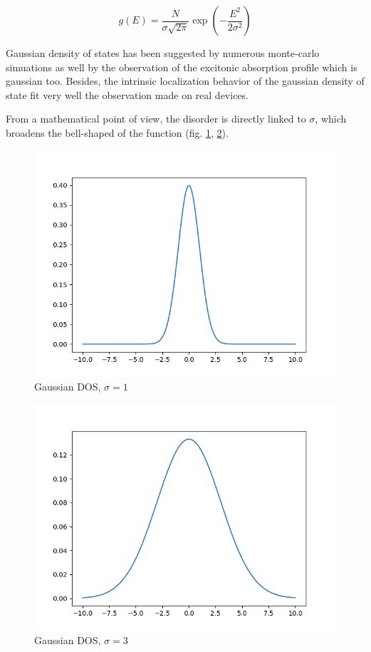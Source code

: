\begin{equation}
    g(E)=\frac{N}{\sigma \sqrt{2 \pi}} \exp \left(-\frac{E^{2}}{2 \sigma^{2}}\right)
    \label{eq:5}
\end{equation}

Gaussian density of states has been suggested by numerous monte-carlo simuations \cite{DOS_monte_carlo} as well by the observation of the excitonic absorption profile which is gaussian too. Besides, the intrinsic localization behavior of the gaussian density of state fit very well the observation made on real devices.

From a mathematical point of view, the disorder is directly linked to $\sigma$, which broadens the bell-shaped of the function (fig. \ref{fig:5}, \ref{fig:6}).

\begin{figure}
    \centering
    \includegraphics*[width=.5\paperwidth]{figures/DOS_1.png}
    \caption{Gaussian DOS, $\sigma=1$ \label{fig:5}}
\end{figure}

\begin{figure}
    \centering
    \includegraphics*[width=.5\paperwidth]{figures/DOS_3.png}
    \caption{Gaussian DOS, $\sigma=3$ \label{fig:6}}
\end{figure}

